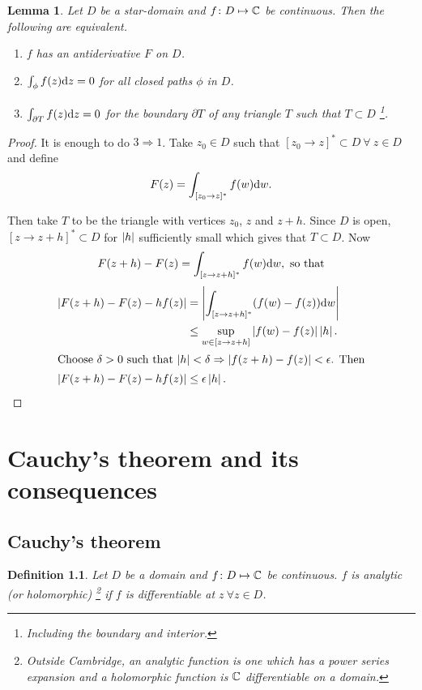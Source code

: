 \documentclass{notes}
\theoremstyle{plain}
\newtheorem{definition}[proposition]{Definition}
\newtheorem{lemma}[proposition]{Lemma}
\begin{document}
\begin{lemma}
Let $D$ be a star-domain and $f \colon D \mapsto \mathbb{C}$ be continuous.  Then the
following are equivalent.
\begin{enumerate}
\item $f$ has an antiderivative $F$ on $D$.
\item $\int_\phi f(z) \mathrm{d} z = 0$ for all closed paths $\phi$ in $D$.
\item $\int_{\partial T} f(z) \mathrm{d} z = 0$ for the boundary $\partial T$ of
any triangle $T$ such that $T \subset D$ \footnote{Including the boundary
and interior.}.
\end{enumerate}
\end{lemma}

\begin{proof}
It is enough to do $3 \Rightarrow 1$.  Take $z_0 \in D$ such that
$[z_0 \rightarrow z]^* \subset D\ \forall\ z \in D$ and define
\[
F(z) = \int_{[z_0 \rightarrow z]^*} f(w) \mathrm{d} w.
\]

Then take $T$ to be the triangle with vertices $z_0$, $z$ and $z+h$.  Since
$D$ is open, $[z \rightarrow z+h]^* \subset D$ for $\left|h\right|$ sufficiently
small which gives that $T \subset D$.  Now 
\[
F(z+h)-F(z) = \int_{[z \rightarrow z+h]^*} f(w) \mathrm{d} w, \text{ so that}
\]
\begin{align*}
\left|F(z+h)-F(z) - h f(z)\right| 
&= \left| \int_{[z \rightarrow z+h]^*} (f(w)-f(z)) \mathrm{d} w\right| \\
&\le \sup_{w \in [z \rightarrow z+h]} \left|f(w)-f(z)\right| \left|h\right|. \\
\intertext{Choose $\delta > 0$ such that $\left|h\right| < \delta \Rightarrow
\left|f(z+h)-f(z)\right| < \epsilon$. Then}
\left|F(z+h)-F(z) - h f(z)\right| &\le \epsilon \left|h\right|.
\end{align*}
\end{proof}

\chapter{Cauchy's theorem and its consequences}

\section{Cauchy's theorem}

\begin{definition}
Let $D$ be a domain and $f \colon D \mapsto \mathbb{C}$ be continuous.  $f$ is
analytic (or holomorphic)%
\footnote{Outside Cambridge, an analytic
function is one which has a power series expansion and a holomorphic
function is $\mathbb{C}$ differentiable on a domain.}
if $f$ is differentiable at $z\ \forall z \in D$.
\end{definition}
\end{document}
